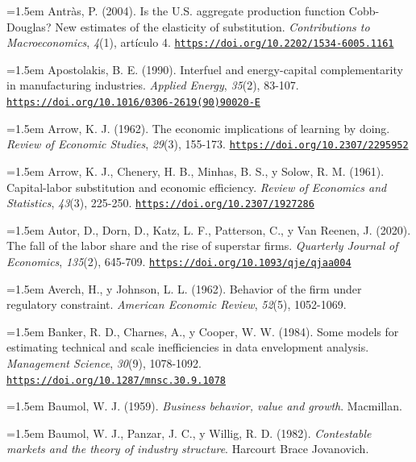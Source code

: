 \documentclass[10pt,a4paper]{article}
\begin{document}
\noindent\hangindent=1.5em Antràs, P. (2004). Is the U.S. aggregate production function Cobb-Douglas? New estimates of the elasticity of substitution. \textit{Contributions to Macroeconomics}, \textit{4}(1), artículo 4. \href{https://doi.org/10.2202/1534-6005.1161}{\nolinkurl{https://doi.org/10.2202/1534-6005.1161}}

\noindent\hangindent=1.5em Apostolakis, B. E. (1990). Interfuel and energy-capital complementarity in manufacturing industries. \textit{Applied Energy}, \textit{35}(2), 83-107. \href{https://doi.org/10.1016/0306-2619(90)90020-E}{\nolinkurl{https://doi.org/10.1016/0306-2619(90)90020-E}}

\noindent\hangindent=1.5em Arrow, K. J. (1962). The economic implications of learning by doing. \textit{Review of Economic Studies}, \textit{29}(3), 155-173. \href{https://doi.org/10.2307/2295952}{\nolinkurl{https://doi.org/10.2307/2295952}}

\noindent\hangindent=1.5em Arrow, K. J., Chenery, H. B., Minhas, B. S., y Solow, R. M. (1961). Capital-labor substitution and economic efficiency. \textit{Review of Economics and Statistics}, \textit{43}(3), 225-250. \href{https://doi.org/10.2307/1927286}{\nolinkurl{https://doi.org/10.2307/1927286}}

\noindent\hangindent=1.5em Autor, D., Dorn, D., Katz, L. F., Patterson, C., y Van Reenen, J. (2020). The fall of the labor share and the rise of superstar firms. \textit{Quarterly Journal of Economics}, \textit{135}(2), 645-709. \href{https://doi.org/10.1093/qje/qjaa004}{\nolinkurl{https://doi.org/10.1093/qje/qjaa004}}

\noindent\hangindent=1.5em Averch, H., y Johnson, L. L. (1962). Behavior of the firm under regulatory constraint. \textit{American Economic Review}, \textit{52}(5), 1052-1069.

\noindent\hangindent=1.5em Banker, R. D., Charnes, A., y Cooper, W. W. (1984). Some models for estimating technical and scale inefficiencies in data envelopment analysis. \textit{Management Science}, \textit{30}(9), 1078-1092. \href{https://doi.org/10.1287/mnsc.30.9.1078}{\nolinkurl{https://doi.org/10.1287/mnsc.30.9.1078}}

\noindent\hangindent=1.5em Baumol, W. J. (1959). \textit{Business behavior, value and growth}. Macmillan.

\noindent\hangindent=1.5em Baumol, W. J., Panzar, J. C., y Willig, R. D. (1982). \textit{Contestable markets and the theory of industry structure}. Harcourt Brace Jovanovich.
\end{document}
